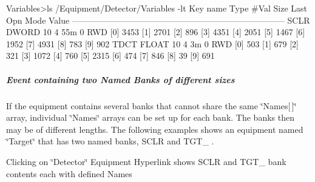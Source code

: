 \begin{DoxyCode}
Variables>ls /Equipment/Detector/Variables -lt
Key name                        Type    #Val  Size  Last Opn Mode Value
---------------------------------------------------------------------------
SCLR                            DWORD   10    4     55m  0   RWD
                                        [0]             3453
                                        [1]             2701
                                        [2]             896
                                        [3]             4351
                                        [4]             2051
                                        [5]             1467
                                        [6]             1952
                                        [7]             4931
                                        [8]             783
                                        [9]             902  
TDCT                            FLOAT   10    4     3m   0   RWD
                                        [0]             503
                                        [1]             679
                                        [2]             321
                                        [3]             1072
                                        [4]             760
                                        [5]             2315
                                        [6]             474
                                        [7]             846
                                        [8]             39
                                        [9]             691
\end{DoxyCode}


\par


\par
\hypertarget{RC_mhttpd_Equipment_page_RC_mhttpd_Equipment_example4}{}\subparagraph{Event containing two Named Banks of different sizes}\label{RC_mhttpd_Equipment_page_RC_mhttpd_Equipment_example4}
If the equipment contains several banks that cannot share the same \char`\"{}Names\mbox{[}$\,$\mbox{]}\char`\"{} array, individual \char`\"{}Names\char`\"{} arrays can be set up for each bank. The banks then may be of different lengths. The following examples shows an equipment named \char`\"{}Target\char`\"{} that has two named banks, SCLR and TGT\_\- .

\par
\par
\par
 \begin{center}  Clicking on \char`\"{}Detector\char`\"{} Equipment Hyperlink shows SCLR and TGT\_\- bank contents each with defined Names \par
\par
\par
  \end{center}  \par
\par
\par


